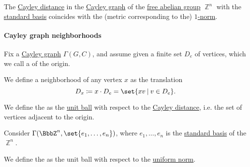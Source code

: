 \begin{proposition}\label{thm:cayley_distance_integer_lattice}
  The \hyperref[def:cayley_distance]{Cayley distance} in the \hyperref[def:cayley_graph]{Cayley graph} of the \hyperref[def:free_abelian_group]{free abelian group} \( \BbbZ^n \) with the \hyperref[def:sequence_space]{standard basis} coincides with the (metric corresponding to the) \hyperref[def:p_norm]{\( 1 \)-norm}.
\end{proposition}

\paragraph{Cayley graph neighborhoods}

\begin{definition}\label{def:cayley_graph_neighborhood}
  Fix a \hyperref[def:cayley_graph]{Cayley graph} \( \Gamma(G, C) \), and assume given a finite set \( D_e \) of vertices, which we call a  of the origin.

  We define a neighborhood of any vertex \( x \) as the translation
  \begin{equation*}
    D_x \coloneqq x \cdot D_e = \set{ xv \given v \in D_e }.
  \end{equation*}

  \begin{thmenum}
     We define the  as the \hyperref[def:metric_space/ball]{unit ball} with respect to the \hyperref[def:cayley_distance]{Cayley distance}, i.e. the set of vertices adjacent to the origin.

     Consider \( \Gamma(\BbbZ^n, \set{ e_1, \ldots, e_n }) \), where \( e_1, \ldots, e_n \) is the \hyperref[def:sequence_space]{standard basis} of the \hyperref[def:free_abelian_group]{\( \BbbZ^n \)}.

    We define the  as the unit ball with respect to the \hyperref[def:p_norm]{uniform norm}.
  \end{thmenum}
\end{definition}

